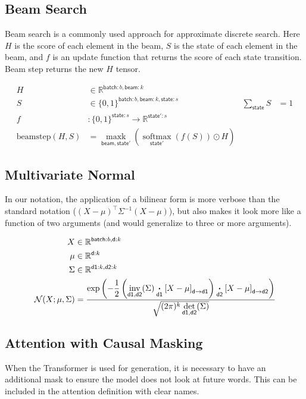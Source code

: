 \documentclass{article}
\newcommand{\name}[1]{\mathsf{#1}}
\newcommand{\nset}[2]{\name{#1}:#2}
\newcommand{\ndot}[1]{\mathbin{\mathop{\thinspace\boldsymbol\cdot\thinspace}\limits_{\name{#1}}}}
\newcommand{\nsum}[1]{\mathop{\sum}_{\name{#1}}}
\newcommand{\nfun}[2]{\mathop{\text{#2}}\limits_{\name{#1}}}
\newcommand{\nmov}[3]{\left[#3\right]_{\name{#1}\rightarrow\name{#2}}}
\newcommand{\reals}{\mathbb{R}}
\begin{document}
\subsection{Beam Search}

Beam search is a commonly used approach for approximate discrete search. Here $H$ is the score of each element in the beam, $S$ is the state of each element in the beam, and $f$ is an update function that returns the score of each state transition. 
Beam step returns the new $H$ tensor. 

\begin{align*} 
H &\in \reals^{{\nset{batch}{b}, \nset{beam}{k}}} \\
S &\in \{0, 1\}^{{\nset{batch}{b}, \nset{beam}{k}, \nset{state}{s}}} & \nsum{state} S &= 1\\
f &\colon \{0, 1\}^{{\nset{state}{s}}} \rightarrow \reals^{{\nset{state'}{s}}} \\ 
\text{beamstep}(H, S) &= \nfun{beam, state'}{maxk} \left( \nfun{state'}{softmax}(f(S)) \odot H \right)
\end{align*} 

\subsection{Multivariate Normal}

In our notation, the application of a bilinear form is more verbose than the standard notation ($(X-\mu)^\top \Sigma^{-1} (X-\mu)$), but also makes it look more like a function of two arguments (and would generalize to three or more arguments).

\begin{align*} 
X &\in \reals^{\nset{batch}{{b}}, \nset{d}{{k}}}  \\
\mu &\in \reals^{{\nset{d}{{k}}}}  \\
\Sigma & \in   \reals^{{\nset{d1}{{k}}, \nset{d2}{{k}}}}  \\
{\cal N}(X; \mu, \Sigma) &= \frac{\displaystyle \exp\left(-\frac{1}{2}  \left(\nfun{d1, d2}{inv}(\Sigma) \ndot{d1} \nmov{d}{d1}{X - \mu} \right) \ndot{d2} \nmov{d}{d2}{X - \mu} \right)}{\sqrt{(2 \pi)^k \nfun{d1, d2}{det}(\Sigma)}}
\end{align*}


\subsection{Attention with Causal Masking}

When the Transformer is used for generation, it is necessary to have
an additional mask to ensure the model does not look at future words.
This can be included in the attention definition with clear names.
\end{document}
